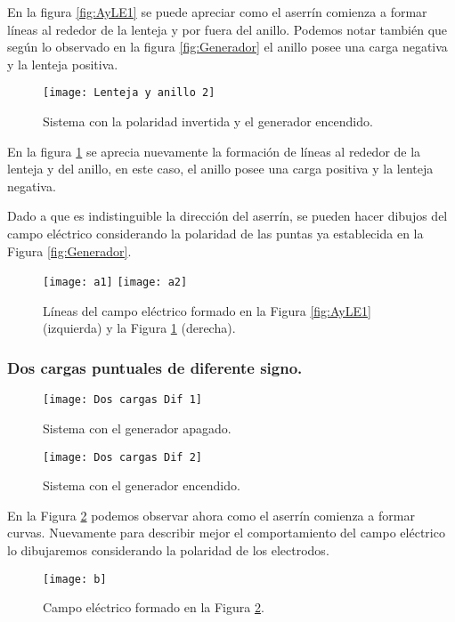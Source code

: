 \documentclass[spanish,10pt,a4paper,onecolumn]{article}
\begin{document}
\newpage
En la figura \ref{fig:AyLE1} se puede apreciar como el aserrín comienza a formar líneas al rededor de la lenteja y por fuera del anillo. Podemos notar también que según lo observado en la figura \ref{fig:Generador} el anillo posee una carga negativa y la lenteja positiva.

\begin{figure}[h!]
	\centering
	\texttt{[image: Lenteja y anillo 2]}
	\caption{Sistema con la polaridad invertida y el generador encendido.}
	\label{fig:AyLE2}
\end{figure}

En la figura \ref{fig:AyLE2} se aprecia nuevamente la formación de líneas al rededor de la lenteja y del anillo, en este caso, el anillo posee una carga positiva y la lenteja negativa. 

Dado a que es indistinguible la dirección del aserrín, se pueden hacer dibujos del campo eléctrico considerando la polaridad de las puntas ya establecida en la Figura \ref{fig:Generador}.

\begin{figure}[h!]
	\centering
	\texttt{[image: a1]}
	\texttt{[image: a2]}
	\caption{Líneas del campo eléctrico formado en la Figura \ref{fig:AyLE1} (izquierda) y la Figura \ref{fig:AyLE2} (derecha).}
\end{figure}

\newpage
\subsubsection{Dos cargas puntuales de diferente signo.}

\begin{figure}[h!]
	\centering
	\texttt{[image: Dos cargas Dif 1]}
	\caption{Sistema con el generador apagado.}
\end{figure}

\begin{figure}[h!]
	\centering
	\texttt{[image: Dos cargas Dif 2]}
	\caption{Sistema con el generador encendido.}
	\label{fig:CDif1}
\end{figure}

\newpage
En la Figura \ref{fig:CDif1} podemos observar ahora como el aserrín comienza a formar curvas. Nuevamente para describir mejor el comportamiento del campo eléctrico lo dibujaremos considerando la polaridad de los electrodos.

\begin{figure}[h!]
	\centering
	\texttt{[image: b]}
	\caption{Campo eléctrico formado en la Figura \ref{fig:CDif1}.}
	
\end{figure}
\end{document}
